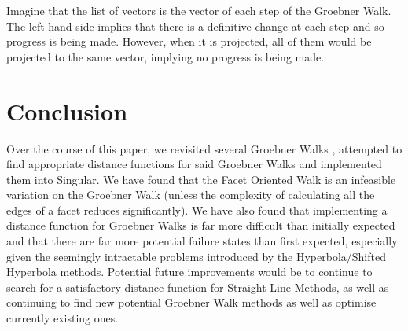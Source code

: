 \documentclass[12pt,a4paper]{report}
\begin{document}
Imagine that the list of vectors is the vector of each step of the Groebner Walk. The left hand side implies that there is a definitive change at each step and so progress is being made. However, when it is projected, all of them would be projected to the same vector, implying no progress is being made.

\chapter{Conclusion}

Over the course of this paper, we revisited several Groebner Walks , attempted to find appropriate distance functions for said Groebner Walks and implemented them into Singular. We have found that the Facet Oriented Walk is an infeasible variation on the Groebner Walk (unless the complexity of calculating all the edges of a facet reduces significantly). We have also found that implementing a distance function for Groebner Walks is far more difficult than initially expected and that there are far more potential failure states than first expected, especially given the seemingly intractable problems introduced by the Hyperbola/Shifted Hyperbola methods. Potential future improvements would be to continue to search for a satisfactory distance function for Straight Line Methods, as well as continuing to find new potential Groebner Walk methods as well as optimise currently existing ones.
\end{document}

